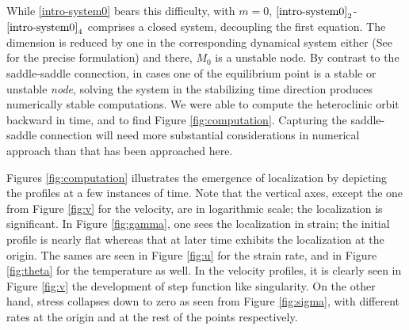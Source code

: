 \documentclass[a4paper,11pt]{article}
\theoremstyle{remark}
\begin{document}
While \eqref{intro-system0} bears this difficulty, with $m=0$, $\eqref{intro-system0}_2$-$\eqref{intro-system0}_4$ comprises a closed system, decoupling the first equation. The dimension is reduced by one in the corresponding dynamical system either (See \cite{KLT_HYP2016} for the precise formulation) and there, $M_0$ is a unstable node. By contrast to the saddle-saddle connection, in cases one of the equilibrium point is a stable or unstable {\it node}, solving the system in the stabilizing time direction produces numerically stable computations. We were able to compute the heteroclinic orbit backward in time, and to find Figure \ref{fig:computation}. Capturing the saddle-saddle connection will need more substantial considerations in numerical approach than that has been approached here.


Figures \ref{fig:computation} illustrates the emergence of localization by depicting the profiles at a few instances of time. Note that the vertical axes, except the one from Figure \ref{fig:v} for the velocity, are in logarithmic scale; the localization is significant. In Figure \ref{fig:gamma}, one sees the localization in strain; the initial profile is nearly flat whereas that at later time exhibits the localization at the origin. The sames are seen in Figure \ref{fig:u} for the strain rate, and in Figure \ref{fig:theta} for the temperature as well. In the velocity profiles, it is clearly seen in Figure \ref{fig:v} the development of step function like singularity. On the other hand, stress collapses down to zero as seen from Figure \ref{fig:sigma}, with different rates at the origin and at the rest of the points respectively.
\end{document}
